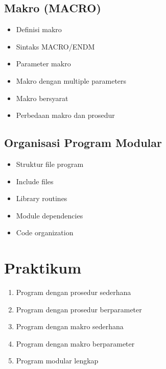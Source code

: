 \subsection{Makro (MACRO)}
\begin{itemize}
\item Definisi makro
\item Sintaks MACRO/ENDM
\item Parameter makro
\item Makro dengan multiple parameters
\item Makro bersyarat
\item Perbedaan makro dan prosedur
\end{itemize}

\subsection{Organisasi Program Modular}
\begin{itemize}
\item Struktur file program
\item Include files
\item Library routines
\item Module dependencies
\item Code organization
\end{itemize}

\section{Praktikum}
\begin{enumerate}
\item Program dengan prosedur sederhana
\item Program dengan prosedur berparameter
\item Program dengan makro sederhana
\item Program dengan makro berparameter
\item Program modular lengkap
\end{enumerate}

